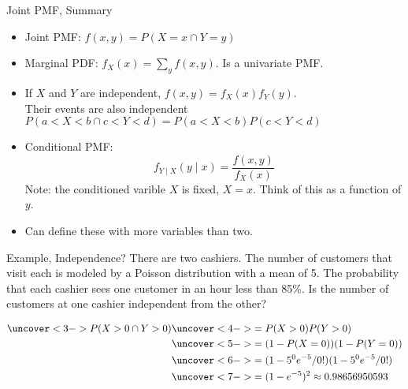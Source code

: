 \documentclass[handout]{beamer}
\begin{document}
\begin{frame}{Joint PMF, Summary}
    \begin{itemize}
        \item Joint PMF: $f(x,y)=P(X=x \cap Y=y)$
        \item Marginal PDF: $f_X(x) = \sum_{y} f(x,y)$. Is a univariate PMF.
        \item If $X$ and $Y$ are independent, $f(x,y)=f_X(x)f_Y(y)$. \\
        Their events are also independent $P(a<X<b \cap c<Y<d) = P(a<X<b)P(c<Y<d)$
        \item Conditional PMF: 
        $$f_{Y\mid X}(y\mid x) = \frac{f(x,y)}{f_X(x)}$$
        Note: the conditioned varible $X$ is fixed, $X=x$. Think of this as a function of $y$.
        \item Can define these with more variables than two.
    \end{itemize}
\end{frame}

\begin{frame}{Example, Independence?}
    There are two cashiers. The number of customers that visit each is modeled by a Poisson distribution with a mean of 5. The probability that each cashier sees one customer in an hour less than 85\%. Is the number of customers at one cashier independent from the other?

    \begin{align*}
        \uncover<3->{P(X>0\cap Y>0)} & \uncover<4->{= P(X>0)P(Y>0)}\\
        & \uncover<5->{= (1-P(X=0))(1-P(Y=0))}\\
        & \uncover<6->{= (1-5^0e^{-5}/0!)(1-5^0e^{-5}/0!)}\\
        & \uncover<7->{= (1-e^{-5})^2 \approx 0.98656950593}\\
    \end{align*}
\end{frame}
\end{document}
